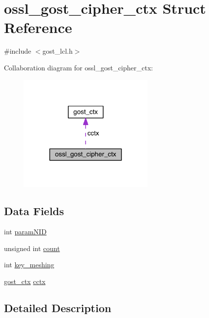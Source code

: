 \hypertarget{structossl__gost__cipher__ctx}{}\section{ossl\+\_\+gost\+\_\+cipher\+\_\+ctx Struct Reference}
\label{structossl__gost__cipher__ctx}


{\ttfamily \#include $<$gost\+\_\+lcl.\+h$>$}



Collaboration diagram for ossl\+\_\+gost\+\_\+cipher\+\_\+ctx\+:\nopagebreak
\begin{figure}[H]
\begin{center}
\leavevmode
\includegraphics[width=189pt]{structossl__gost__cipher__ctx__coll__graph}
\end{center}
\end{figure}
\subsection*{Data Fields}
\begin{DoxyCompactItemize}
\item 
int \hyperlink{structossl__gost__cipher__ctx_a9255e179af3b5ea6f18f7a36cc911ce3}{param\+N\+ID}
\item 
unsigned int \hyperlink{structossl__gost__cipher__ctx_a16ff2d8e15ade4948398b0aeb80124a8}{count}
\item 
int \hyperlink{structossl__gost__cipher__ctx_a0d26c1455c49156afaa4c8194010ed56}{key\+\_\+meshing}
\item 
\hyperlink{structgost__ctx}{gost\+\_\+ctx} \hyperlink{structossl__gost__cipher__ctx_a4536f57bd141b77644121499b784cabf}{cctx}
\end{DoxyCompactItemize}


\subsection{Detailed Description}


